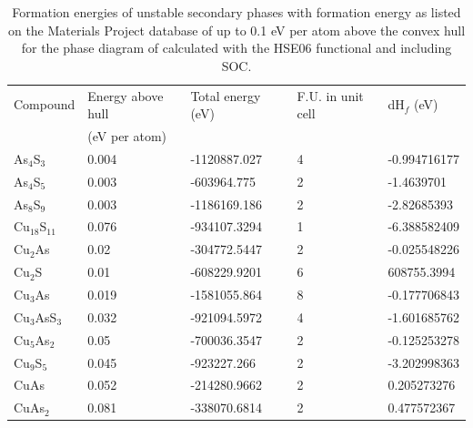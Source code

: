 \documentclass[11pt, twoside]{report}
\begin{document}
\begin{table}[]
\begin{tabular}{@{}lllll@{}}
\toprule
Compound & Energy above hull  & Total energy (eV) & F.U. in unit cell & dH$_f$ (eV)   \\ 
         & (eV per atom)      &                   &                   &               \\ \midrule
As$_4$S$_3$    & 0.004                           & -1120887.027      & 4                 & -0.994716177 \\
As$_4$S$_5$    & 0.003                           & -603964.775       & 2                 & -1.4639701   \\
As$_8$S$_9$    & 0.003                           & -1186169.186      & 2                 & -2.82685393  \\
Cu$_18$S$_11$  & 0.076                           & -934107.3294      & 1                 & -6.388582409 \\
Cu$_2$As    & 0.02                            & -304772.5447      & 2                 & -0.025548226 \\
Cu$_2$S     & 0.01                            & -608229.9201      & 6                 & 608755.3994  \\
Cu$_3$As    & 0.019                           & -1581055.864      & 8                 & -0.177706843 \\
Cu$_3$AsS$_3$  & 0.032                           & -921094.5972      & 4                 & -1.601685762 \\
Cu$_5$As$_2$   & 0.05                            & -700036.3547      & 2                 & -0.125253278 \\
Cu$_9$S$_5$    & 0.045                           & -923227.266       & 2                 & -3.202998363 \\
CuAs     & 0.052                           & -214280.9662      & 2                 & 0.205273276  \\
CuAs$_2$    & 0.081                           & -338070.6814      & 2                 & 0.477572367  \\ \bottomrule
\end{tabular}
\caption{Formation energies of unstable secondary phases with formation energy as listed on the Materials Project database of up to 0.1 eV per atom above the convex hull for the phase diagram of {\enargite} calculated with the HSE06 functional and including SOC.}\label{enargite_above_hull}
\end{table}
\end{document}
